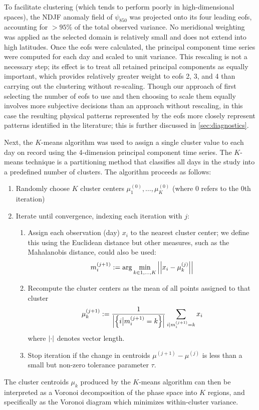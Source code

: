 \documentclass[twocol]{ametsoc}
\begin{document}
To facilitate clustering (which tends to perform poorly in high-dimensional spaces), the NDJF anomaly field of $\psi_{850}$ was projected  onto its four leading \glspl{eof}, accounting for $>95\%$ of the total observed variance.
No meridional weighting was applied as the selected domain is relatively small and does not extend into high latitudes.
Once the \glspl{eof} were calculated, the principal component time series were computed for each day and scaled to unit variance.
This rescaling is not a necessary step; its effect is to treat all retained principal components as equally important, which provides relatively greater weight to \glspl{eof} 2, 3, and 4 than carrying out the clustering without re-scaling.
Though our approach of first selecting the number of \glspl{eof} to use and then choosing to scale them equally involves more subjective decisions than an approach without rescaling, in this case the resulting physical patterns represented by the \glspl{eof} more closely represent patterns identified in the literature; this is further discussed in \cref{sec:diagnostics}.

Next, the $K$-means algorithm was used to assign a single cluster value to each day on record using the 4-dimension principal component time series.
The $K$-means technique is a partitioning method that classifies all days in the study into a predefined number of clusters.
The algorithm proceeds as follows:
\begin{enumerate}
	\item Randomly choose $K$ cluster centers $\mu_1^{(0)}, \ldots, \mu_K^{(0)}$ (where $0$ refers to the $0$th iteration)
	\item Iterate until convergence, indexing each iteration with $j$:
	\begin{enumerate}
		\item Assign each observation (day) $x_i$ to the nearest cluster center; we define this using the Euclidean distance but other measures, such as the Mahalanobis distance, could also be used:
		\begin{equation}
			m_i^{(j+1)} := \arg\min_{k\in 1,\ldots,K} \abs{\abs{x_i - \mu_k^{(j)}}}
		\end{equation}
		\item Recompute the cluster centers as the mean of all points assigned to that cluster
		\begin{equation}
			\mu_k^{(j+1)} := \frac{1}{\abs{\qty{i \big| m_i^{(j+1)}=k}}} \sum_{i | m_i^{(j+1)}=k} x_i
		\end{equation}
		where $\abs{\cdot}$ denotes vector length.
		\item Stop iteration if the change in centroids $\mu^{(j+1)} - \mu^{(j)}$ is less than a small but non-zero tolerance parameter $\tau$.
	\end{enumerate}
\end{enumerate}
The cluster centroids $\mu_k$ produced by the $K$-means algorithm can then be interpreted as a Voronoi decomposition of the phase space into $K$ regions, and specifically as the Voronoi diagram which minimizes within-cluster variance.
\end{document}
